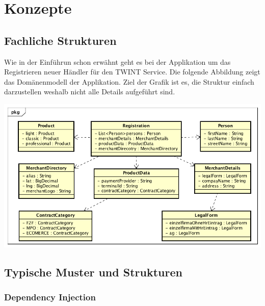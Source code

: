 \graphicspath{{./images/}}

\chapter{Konzepte}

\section{Fachliche Strukturen}

Wie in der Einführun schon erwähnt geht es bei der Applikation um das Registrieren neuer Händler für den TWINT Service. Die folgende Abbildung zeigt das Domänenmodell der Applikation. Ziel der Grafik ist es, die Struktur einfach darzustellen weshalb nicht alle Details aufgeführt sind. 

\begin{center}
	\includegraphics[scale=0.6]{DomainModel.png}
\end{center}

\section{Typische Muster und Strukturen}

\subsection{Dependency Injection}

